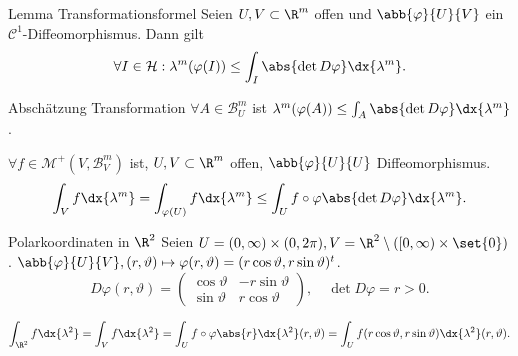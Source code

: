 \begin{karte}{Lemma Transformationsformel}
    Seien \(U, V \subset \R^m\) offen und \( \abb{\varphi}{U}{V} \) ein 
    \( \mathcal{C}^1 \)-Diffeomorphismus. Dann gilt 
    \[ \forall I \in \mathcal{H}: \lambda^m(\varphi(I)) \leq \int_I \abs{\det D\varphi} \dx{\lambda^m}. \]
\end{karte}

\begin{karte}{Abschätzung Transformation}
    \( \forall A \in \mathcal{B}_U^m \) ist \( \lambda^m(\varphi(A)) 
    \leq \int_A \abs{\det D\varphi} \dx{\lambda^m} \).

    \( \forall f \in \mathcal{M}^+(V, \mathcal{B}_V^m) \) ist, 
    \(U, V \subset \R^m\) offen, \(\abb{\varphi}{U}{U}\) Diffeomorphismus. 
    \[ \int_V f \dx{\lambda^m} = \int_{\varphi(U)} f \dx{\lambda^m} 
    \leq \int_U f\circ \varphi \abs{\det D\varphi} \dx{\lambda^m}. \]
\end{karte}

\begin{karte}{Polarkoordinaten in \(\R^2\)}
    Seien \( U = (0,\infty) \times (0,2\pi), V = \R^2 \setminus ([0,\infty) \times \set{0}) \). 
    \( \abb{\varphi}{U}{V}, (r,\vartheta) \mapsto \varphi(r,\vartheta) 
    = (r \cos \vartheta, r \sin \vartheta)^t \).
    \[ D\varphi(r,\vartheta) = \begin{pmatrix}
        \cos\vartheta & -r\sin \vartheta \\
        \sin \vartheta & r \cos \vartheta
    \end{pmatrix}, \quad \det D\varphi = r > 0. \]

    \[ \int_{\R^2} f\dx{\lambda^2} = \int_V f \dx{\lambda^2} 
    = \int_U f\circ \varphi \abs{r} \dx{\lambda^2}(r,\vartheta)
    = \int_U f(r \cos\vartheta, r\sin\vartheta)\dx{\lambda^2}(r,\vartheta). \]
\end{karte}
